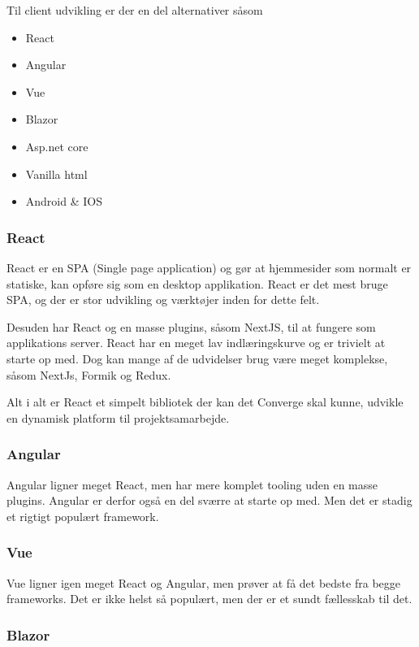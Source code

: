 Til client udvikling er der en del alternativer såsom

\begin{itemize}
    \item React
    \item Angular
    \item Vue
    \item Blazor
    \item Asp.net core
    \item Vanilla html
    \item Android \& IOS
\end{itemize}

\subsubsection{React}

React er en SPA (Single page application) og gør at hjemmesider som normalt er statiske, kan opføre sig som en desktop applikation. React er det mest bruge SPA, og der er stor udvikling og værktøjer inden for dette felt.

Desuden har React og en masse plugins, såsom NextJS, til at fungere som applikations server. React har en meget lav indlæringskurve og er trivielt at starte op med. Dog kan mange af de udvidelser brug være meget komplekse, såsom NextJs, Formik og Redux. 

Alt i alt er React et simpelt bibliotek der kan det Converge skal kunne, udvikle en dynamisk platform til projektsamarbejde.

\subsubsection{Angular}

Angular ligner meget React, men har mere komplet tooling uden en masse plugins. Angular er derfor også en del sværre at starte op med. Men det er stadig et rigtigt populært framework.

\subsubsection{Vue}

Vue ligner igen meget React og Angular, men prøver at få det bedste fra begge frameworks. Det er ikke helst så populært, men der er et sundt fællesskab til det.

\subsubsection{Blazor}

